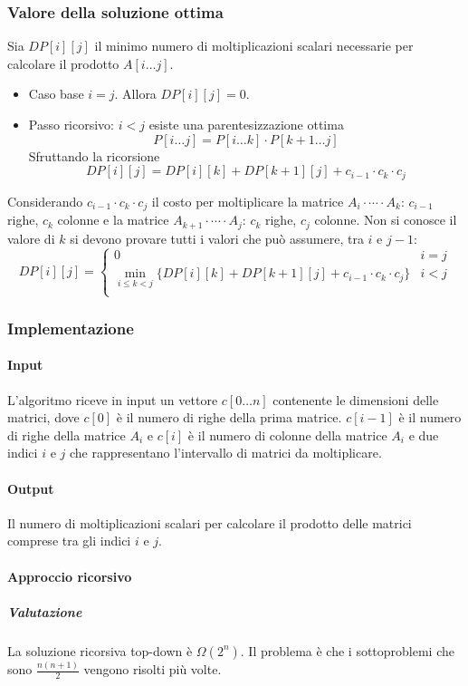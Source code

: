 \subsubsection{Valore della soluzione ottima}
Sia $DP[i][j]$ il minimo numero di moltiplicazioni scalari necessarie per calcolare il prodotto $A[i\dots j]$. 
\begin{itemize}
	\item Caso base $i=j$. Allora $DP[i][j]=0$.
	\item Passo ricorsivo: $i<j$ esiste una parentesizzazione ottima $$P[i\dots j] = P[i\dots k]\cdot P[k+1\dots j]$$ Sfruttando la ricorsione 
		$$DP[i][j] = DP[i][k]+DP[k+1][j]+c_{i-1}\cdot c_k\cdot c_j$$
\end{itemize}
Considerando $c_{i-1}\cdot c_k\cdot c_j$ il costo per moltiplicare la matrice $A_i\cdot\cdots\cdot A_k$: $c_{i-1}$ righe, $c_k$ colonne e la matrice $A_{k+1}\cdot\cdots\cdot A_j$:
$c_k$ righe, $c_j$ colonne. Non si conosce il valore di $k$ si devono provare tutti i valori che pu\`o assumere, tra $i$ e $j-1$:
$$DP[i][j] = \begin{cases}
	0 & i = j\\
	\min\limits_{i\le k < j}\{DP[i][k]+DP[k+1][j]+c_{i-1}\cdot c_k\cdot c_j\} & i < j\\
\end{cases}$$
\subsubsection{Implementazione}
\paragraph{Input}
L'algoritmo riceve in input un vettore $c[0\dots n]$ contenente le dimensioni delle matrici, dove $c[0]$ \`e il numero di righe della prima matrice. $c[i-1]$ \`e il numero di righe 
della matrice $A_i$ e $c[i]$ \`e il numero di colonne della matrice $A_i$ e due indici $i$ e $j$ che rappresentano l'intervallo di matrici da moltiplicare. 
\paragraph{Output}
Il numero di moltiplicazioni scalari per calcolare il prodotto delle matrici comprese tra gli indici $i$ e $j$.
\paragraph{Approccio ricorsivo}

\subparagraph{Valutazione}
La soluzione ricorsiva top-down \`e $\Omega(2^n)$. Il problema \`e che i sottoproblemi che sono $\frac{n(n+1)}{2}$ vengono risolti pi\`u volte.
